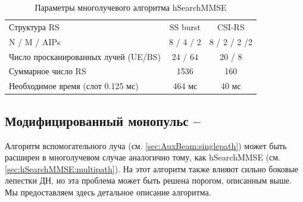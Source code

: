 \begin{table}[h!]
    \centering
    \caption{Параметры многолучевого алгоритма hSearchMMSE}
    \label{tab:4.6}
    \begin{tabular}{lcc}
        \toprule
        \midrule
        Структура RS                         & SS burst  & CSI-RS       \\
        N / M / AIPs                         & 8 / 4 / 2 & 8 / 2 / 2 /2 \\
        Число просканированных лучей (UE/BS) & 24 / 64   & 20 / 8       \\
        Суммарное число RS                   & 1536      & 160          \\
        Необходимое время (слот 0.125 мс)    & 464 мс    & 40 мс        \\
        \hline
    \end{tabular}
\end{table}



\subsection[Модифицированный моноимпульс]{Модифицированный монопульс -- \AuxBeam}
\label{sec:AuxBeam:multipath}


Алгоритм вспомогательного луча (см. \ref{sec:AuxBeam:singlepath})
может быть расширен в многолучевом
случае аналогично тому, как hSearchMMSE (см. \ref{sec:hSearchMMSE:multipath}).
На этот алгоритм также влияют сильно боковые лепестки ДН, но эта проблема
может быть решена порогом, описанным выше. Мы предоставляем здесь
детальное описание алгоритма.

